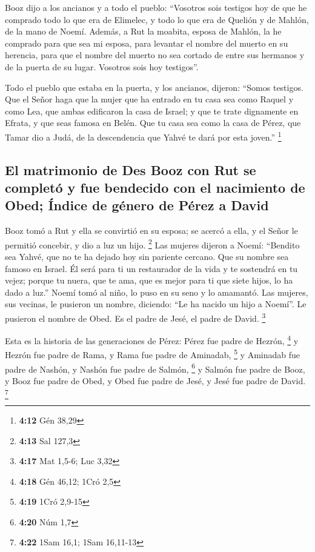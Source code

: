 \begin{paracol}{2}
 Booz dijo a los ancianos y a todo el pueblo: ``Vosotros
sois testigos hoy de que he comprado todo lo que era de Elimelec, y todo
lo que era de Quelión y de Mahlón, de la mano de Noemí. 
Además, a Rut la moabita, esposa de Mahlón, la he comprado para que sea
mi esposa, para levantar el nombre del muerto en su herencia, para que
el nombre del muerto no sea cortado de entre sus hermanos y de la puerta
de su lugar. Vosotros sois hoy testigos''.

 Todo el pueblo que estaba en la puerta, y los ancianos,
dijeron: ``Somos testigos. Que el Señor haga que la mujer que ha entrado
en tu casa sea como Raquel y como Lea, que ambas edificaron la casa de
Israel; y que te trate dignamente en Efrata, y que seas famosa en Belén.
 Que tu casa sea como la casa de Pérez, que Tamar dio a
Judá, de la descendencia que Yahvé te dará por esta joven.'' \footnote{\textbf{4:12}
  Gén 38,29}

\hypertarget{el-matrimonio-de-des-booz-con-rut-se-completuxf3-y-fue-bendecido-con-el-nacimiento-de-obed-uxedndice-de-guxe9nero-de-puxe9rez-a-david}{%
\subsection{El matrimonio de Des Booz con Rut se completó y fue
bendecido con el nacimiento de Obed; Índice de género de Pérez a
David}\label{el-matrimonio-de-des-booz-con-rut-se-completuxf3-y-fue-bendecido-con-el-nacimiento-de-obed-uxedndice-de-guxe9nero-de-puxe9rez-a-david}}

 Booz tomó a Rut y ella se convirtió en su esposa; se
acercó a ella, y el Señor le permitió concebir, y dio a luz un hijo.
\footnote{\textbf{4:13} Sal 127,3}  Las mujeres dijeron a
Noemí: ``Bendito sea Yahvé, que no te ha dejado hoy sin pariente
cercano. Que su nombre sea famoso en Israel.  Él será
para ti un restaurador de la vida y te sostendrá en tu vejez; porque tu
nuera, que te ama, que es mejor para ti que siete hijos, lo ha dado a
luz.''  Noemí tomó al niño, lo puso en su seno y lo
amamantó.  Las mujeres, sus vecinas, le pusieron un
nombre, diciendo: ``Le ha nacido un hijo a Noemí''. Le pusieron el
nombre de Obed. Es el padre de Jesé, el padre de David. \footnote{\textbf{4:17}
  Mat 1,5-6; Luc 3,32}

 Esta es la historia de las generaciones de Pérez: Pérez
fue padre de Hezrón, \footnote{\textbf{4:18} Gén 46,12; 1Cró 2,5}
 y Hezrón fue padre de Rama, y Rama fue padre de
Aminadab, \footnote{\textbf{4:19} 1Cró 2,9-15}  y
Aminadab fue padre de Nashón, y Nashón fue padre de Salmón, \footnote{\textbf{4:20}
  Núm 1,7}  y Salmón fue padre de Booz, y Booz fue padre
de Obed,  y Obed fue padre de Jesé, y Jesé fue padre de
David. \footnote{\textbf{4:22} 1Sam 16,1; 1Sam 16,11-13} \switchcolumn
\begin{otherlanguage}{english}


\end{otherlanguage}
\end{paracol}
